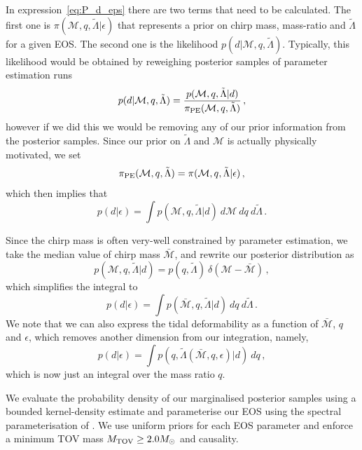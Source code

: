 \documentclass[twocolumn,linenumbers]{aastex631}
\begin{document}
In expression~\eqref{eq:P_d_eps} there are two terms that need to be
calculated. The first one is $\pi(\mathcal{M}, q,
\tilde{\Lambda}|\epsilon)$ that represents a prior on chirp mass,
mass-ratio and $\tilde{\Lambda}$ for a given EOS. The second
one is the likelihood $p(d|\mathcal{M},q,\tilde{\Lambda})$. Typically,
this likelihood would be obtained by reweighing posterior samples of
parameter estimation runs
%
\begin{equation}
    p(d|\mathcal{M},q,\tilde{\Lambda}) =
    \frac{p(\mathcal{M},q,\tilde{\Lambda}|d)}{\pi_{\rm
        PE}(\mathcal{M},q,\tilde{\Lambda})}\,,
\end{equation}
%
however if we did this we would be removing any of our prior information
from the posterior samples. Since our prior on $\tilde{\Lambda}$ and
$\mathcal{M}$ is actually physically motivated, we set
%
\begin{equation}
    \pi_{\rm PE}(\mathcal{M},q,\tilde{\Lambda}) =
    \pi(\mathcal{M},q,\tilde{\Lambda}|\epsilon)\,,
\end{equation}
%
which then implies that
%
\begin{equation}
    p(d|\epsilon) = \int p(\mathcal{M},q,\tilde{\Lambda}|d)\ d
    \mathcal{M} \ d q \ d \tilde{\Lambda}\,.
\end{equation}

Since the chirp mass is often very-well constrained by parameter
estimation, we take the median value of chirp mass $\bar{\mathcal{M}}$,
and rewrite our posterior distribution as
%
\begin{equation}
    p(\mathcal{M},q,\tilde{\Lambda}|d) = p(q,\tilde{\Lambda})
    \ \delta(\mathcal{M}- \bar{\mathcal{M}})\,,
\end{equation}
%
which simplifies the integral to
%
\begin{equation}
    p(d|\epsilon) = \int p(\bar{\mathcal{M}},q,\tilde{\Lambda}|d)\ d q
    \ d \tilde{\Lambda}\,.
\end{equation}
%
We note that we can also express the tidal deformability as a function of
$\bar{\mathcal{M}}$, $q$ and $\epsilon$, which removes another dimension
from our integration, namely,
%
\begin{equation}
        p(d|\epsilon) = \int
        p(q,\tilde{\Lambda}(\bar{\mathcal{M}},q,\epsilon)|d)\ d q\,,
\end{equation}
%
which is now just an integral over the mass ratio $q$.

We evaluate the probability density of our marginalised posterior samples
using a bounded kernel-density estimate and parameterise our EOS using
the spectral parameterisation of \cite{Lindblom2010}. We use uniform
priors for each EOS parameter and enforce a minimum TOV mass $M_{\rm TOV}
\geq 2.0 M_{\odot}$ and causality.
	
\end{document}
